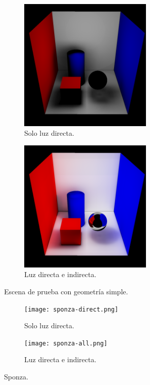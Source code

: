\begin{figure}[ht]
	\centering
    \begin{subfigure}{1.0\textwidth}
        \centering
		\includegraphics[width=0.7\textwidth]{cornell-box-direct.png}
        \caption{Solo luz directa.}
    \end{subfigure}
    \begin{subfigure}{1.0\textwidth}
        \centering
		\includegraphics[width=0.7\textwidth]{cornell-box-full.png}
        \caption{Luz directa e indirecta.}
    \end{subfigure}
	\caption{Escena de prueba con geometría simple.}
	\label{fig:cornell-box-full}
\end{figure}

\begin{figure}[ht]
	\begin{subfigure}{.49\textwidth}
		\centering
		\texttt{[image: sponza-direct.png]}
		\caption{Solo luz directa.}
	\end{subfigure}
	\begin{subfigure}{.49\textwidth}
		\centering
		\texttt{[image: sponza-all.png]}
		\caption{Luz directa e indirecta.}
	\end{subfigure}
	\caption{Sponza.}
	\label{fig:sponza}
\end{figure}

